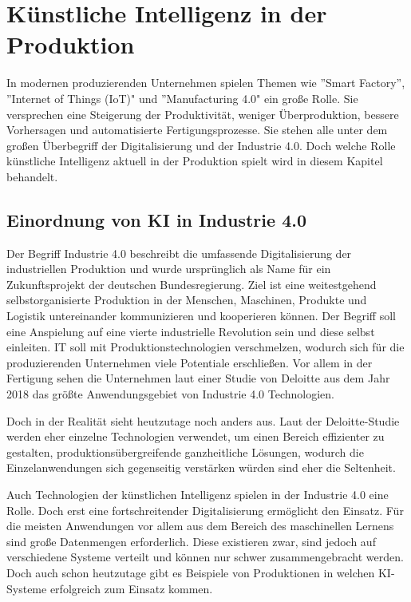 \documentclass[a4paper,12pt, german]{report}
\begin{document}



\chapter{Künstliche Intelligenz in der Produktion}
In modernen produzierenden Unternehmen spielen Themen wie ''Smart Factory'', ''Internet of Things (IoT)" und ''Manufacturing 4.0" ein große Rolle. Sie versprechen eine Steigerung der Produktivität, weniger Überproduktion, bessere Vorhersagen und automatisierte Fertigungsprozesse. Sie stehen alle unter dem großen Überbegriff der Digitalisierung und der Industrie 4.0. Doch welche Rolle künstliche Intelligenz aktuell in der Produktion spielt wird in diesem Kapitel behandelt.

\section{Einordnung von KI in Industrie 4.0}
Der Begriff Industrie 4.0 beschreibt die umfassende Digitalisierung der industriellen Produktion und wurde ursprünglich als Name für ein Zukunftsprojekt der deutschen Bundesregierung. Ziel ist eine weitestgehend selbstorganisierte Produktion in der Menschen, Maschinen, Produkte und Logistik untereinander kommunizieren und kooperieren können. Der Begriff soll eine Anspielung auf eine vierte industrielle Revolution sein und diese selbst einleiten. IT soll mit Produktionstechnologien verschmelzen, wodurch sich für die produzierenden Unternehmen viele Potentiale erschließen. \cite{22}Vor allem in der Fertigung sehen die Unternehmen laut einer Studie von Deloitte aus dem Jahr 2018 das größte Anwendungsgebiet von Industrie 4.0 Technologien.\cite{23}


Doch in der Realität sieht heutzutage noch anders aus. Laut der Deloitte-Studie werden eher einzelne Technologien verwendet, um einen Bereich effizienter zu gestalten, produktionsübergreifende ganzheitliche Lösungen, wodurch die Einzelanwendungen sich gegenseitig verstärken würden sind eher die Seltenheit.

Auch Technologien der künstlichen Intelligenz spielen in der Industrie 4.0 eine Rolle. Doch erst eine fortschreitender Digitalisierung ermöglicht den Einsatz. Für die meisten Anwendungen vor allem aus dem Bereich des maschinellen Lernens sind große Datenmengen erforderlich. Diese existieren zwar, sind jedoch auf verschiedene Systeme verteilt und können nur schwer zusammengebracht werden. Doch auch schon heutzutage gibt es Beispiele von Produktionen in welchen KI-Systeme erfolgreich zum Einsatz kommen. 
 
\end{document}
